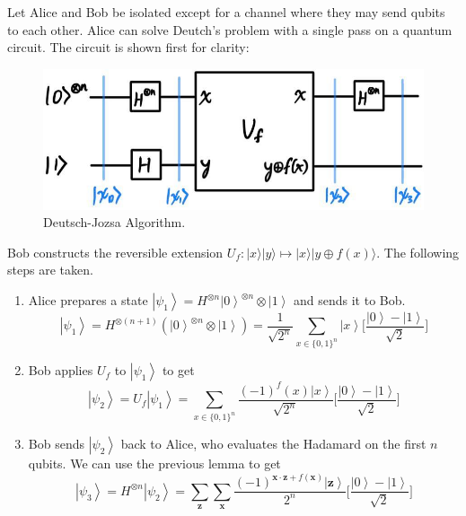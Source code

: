 \documentclass{article}
\newcommand{\ket}[1]{\ensuremath{\left|#1\right\rangle}}
\begin{document}
    \begin{theorem}
      Let Alice and Bob be isolated except for a channel where they may send qubits to each other. Alice can solve Deutch's problem with a single pass on a quantum circuit. The circuit is shown first for clarity:
      \begin{figure}[H]
        \centering 
        \includegraphics[scale=0.3]{img/Deutsch_Jozsa_Algo.jpg}
        \caption{Deutsch-Jozsa Algorithm.} 
        \label{fig:Deutsch_Jozsa_Algo}
      \end{figure}
      Bob constructs the reversible extension $U_f: |x\rangle |y\rangle \mapsto |x \rangle |y \oplus f(x)\rangle$. The following steps are taken.
      \begin{enumerate} 
        \item Alice prepares a state $\ket{\psi_1} = H^{\otimes n} \ket{0}^{\otimes n} \otimes \ket{1}$ and sends it to Bob. 
          \begin{equation} 
            \ket{\psi_1} = H^{\otimes (n+1)} (\ket{0}^{\otimes n} \otimes \ket{1}) = \frac{1}{\sqrt{2^n}} \sum_{x \in \{0, 1\}^n} \ket{x} \bigg[ \frac{\ket{0} - \ket{1}}{\sqrt{2}} \bigg] 
          \end{equation}
        \item Bob applies $U_f$ to $\ket{\psi_1}$ to get 
          \begin{equation} 
            \ket{\psi_2} = U_f \ket{\psi_1} = \sum_{x \in \{0, 1\}^n} \frac{(-1)^f(x) \ket{x}}{\sqrt{2^n}} \bigg[ \frac{\ket{0} - \ket{1}}{\sqrt{2}} \bigg] 
          \end{equation}
        \item Bob sends $\ket{\psi_2}$ back to Alice, who evaluates the Hadamard on the first $n$ qubits. We can use the previous lemma to get 
          \begin{equation} 
            \ket{\psi_3} = H^{\otimes n} \ket{\psi_2} = \sum_\mathbf{z} \sum_{\mathbf{x}} \frac{(-1)^{\mathbf{x} \cdot \mathbf{z} + f(\mathbf{x})} \ket{\mathbf{z}}}{2^n} \bigg[ \frac{\ket{0} - \ket{1}}{\sqrt{2}} \bigg]

\end{equation}
\end{enumerate}
\end{theorem}
\end{document}
